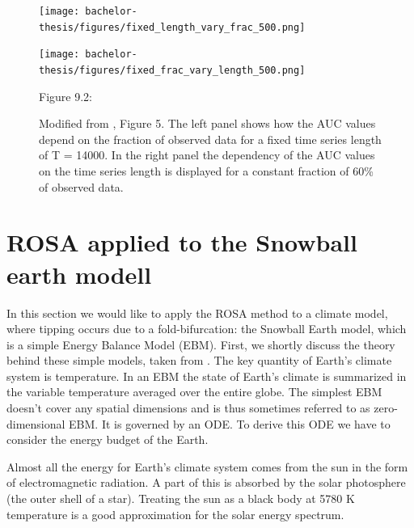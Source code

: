 \documentclass[%
thesis=student,%
coverpage=false,%
titlepage=false,%
headmarks=true, %
english,%
font=libertine, %
math=newpxtx, %
BCOR=5mm,%
coverBCOR=11mm%
]{tumbook}
\begin{document}
\begin{figure}[h!]
    \centering
    \begin{minipage}[t]{0.45\textwidth}
        \centering
        \texttt{[image: bachelor-thesis/figures/fixed\_length\_vary\_frac\_500.png]}
    \end{minipage}
    \hfill
    \begin{minipage}[t]{0.45\textwidth}
        \centering
        \texttt{[image: bachelor-thesis/figures/fixed\_frac\_vary\_length\_500.png]}
    \end{minipage}
    \vspace{0.5cm}
    
    \centering
    \begin{minipage}[b]{0.9\textwidth}
        \centering     
        Figure 9.2: 
    \end{minipage}
    \caption{Modified from \cite{Morr:2024}, Figure 5. The left panel shows how the AUC values depend on the fraction of observed data for a fixed time series length of T = 14000. In the right panel the dependency of the AUC values on the time series length is displayed for a constant fraction of 60\% of observed data. }
    \label{fig:time_length_and_fraction_of_observed_data_dependence}
\end{figure}


\chapter{ROSA applied to the Snowball earth modell}

In this section we would like to apply the ROSA method to a climate model, where tipping occurs due to a fold-bifurcation: the Snowball Earth model, which is a simple Energy Balance Model (EBM). First, we shortly discuss the theory behind these simple models, taken from \cite{Kaper:2013}. The key quantity of Earth's climate system is temperature. In an EBM the state of Earth's climate is summarized in the variable temperature averaged over the entire globe. The simplest EBM doesn't cover any spatial dimensions and is thus sometimes referred to as zero-dimensional EBM. It is governed by an ODE. To derive this ODE we have to consider the energy budget of the Earth.

Almost all the energy for Earth's climate system comes from the sun in the form of electromagnetic radiation. A part of this is absorbed by the solar photosphere (the outer shell of a star). Treating the sun as a black body at 5780 K temperature is a good approximation for the solar energy spectrum.
\end{document}
